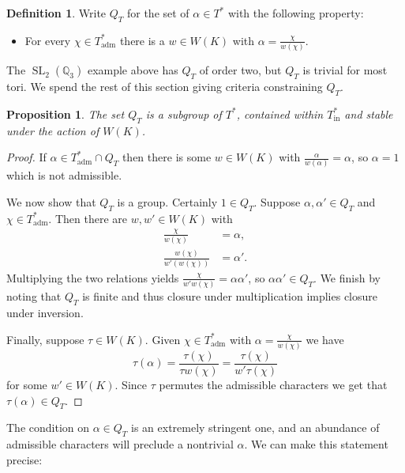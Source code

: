 \documentclass{mrlart7}
\theoremstyle{plain}
\newtheorem{proposition}[theorem]{Proposition}
\theoremstyle{definition}
\newtheorem{definition}[theorem]{Definition}
\numberwithin{equation}{section}
\DeclareMathOperator{\SL}{SL}
\newcommand{\QQ}{\mathbb{Q}}
\newcommand{\Thadm}{T^*_{\operatorname{adm}}}
\newcommand{\Thinadm}{T^*_{\operatorname{in}}}
\newcommand{\hatT}{T^*}
\begin{document}
\begin{definition}
Write $Q_T$ for the set of $\alpha \in \hatT$ with the following property:
\begin{itemize}
\item For every $\chi \in \Thadm$ there is a $w \in W(K)$ with $\alpha = \frac{\chi}{w(\chi)}$.
\end{itemize}
\end{definition}

The $\SL_2(\QQ_3)$ example above has $Q_T$ of order two, but $Q_T$ is trivial for most tori.
We spend the rest of this section giving criteria constraining $Q_T$.

\begin{proposition} \label{irr-sub}
The set $Q_T$ is a subgroup of $\hatT$, contained within $\Thinadm$ and stable under the action of $W(K)$.
\end{proposition}
\begin{proof}
If $\alpha \in \Thadm \cap Q_T$ then there is some $w \in W(K)$ with
$\frac{\alpha}{w(\alpha)} = \alpha$, so $\alpha = 1$ which is not admissible.

We now show that $Q_T$ is a group.  Certainly $1 \in Q_T$.  Suppose
$\alpha, \alpha' \in Q_T$ and $\chi \in \Thadm$.  Then there are $w, w' \in W(K)$ with
\begin{align*}
\frac{\chi}{w(\chi)} &= \alpha, \\
\frac{w(\chi)}{w'(w(\chi))} &= \alpha'.
\end{align*}
Multiplying the two relations yields $\frac{\chi}{w'w(\chi)} = \alpha\alpha'$, so
$\alpha\alpha' \in Q_T$.  We finish by noting that $Q_T$ is finite and thus closure under
multiplication implies closure under inversion.

Finally, suppose $\tau \in W(K)$.  Given $\chi \in \Thadm$ with $\alpha = \frac{\chi}{w(\chi)}$ we have
$$\tau(\alpha) = \frac{\tau(\chi)}{\tau w(\chi)} = \frac{\tau(\chi)}{w' \tau(\chi)}$$
for some $w' \in W(K)$.  Since $\tau$ permutes the admissible characters we get that $\tau(\alpha) \in Q_T$.
\end{proof}

The condition on $\alpha \in Q_T$ is an extremely stringent one, and an abundance of admissible
characters will preclude a nontrivial $\alpha$.  We can make this statement precise:
\end{document}
